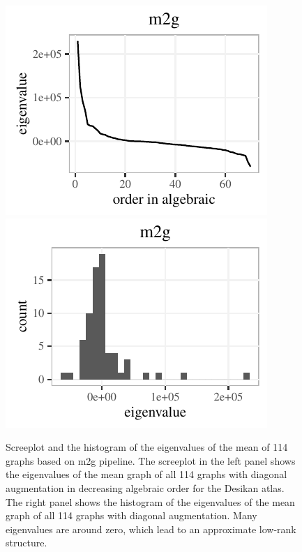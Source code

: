 \begin{figure}[!htbp]
\centering
\includegraphics[height=.22\textheight]{./Figures/screeplot_m2g.pdf}
\includegraphics[height=.22\textheight]{./Figures/hist_m2g.pdf}
\caption{Screeplot and the histogram of the eigenvalues of the  mean of 114 graphs based on m2g pipeline.
The screeplot in the left panel shows the eigenvalues of the mean graph of all 114 graphs with diagonal augmentation in decreasing algebraic order for the Desikan atlas. The right panel shows the histogram of the eigenvalues of the mean graph of all 114 graphs with diagonal augmentation. Many eigenvalues are around zero, which lead to an approximate low-rank structure. 
}
\label{fig:screehist}
\end{figure}

